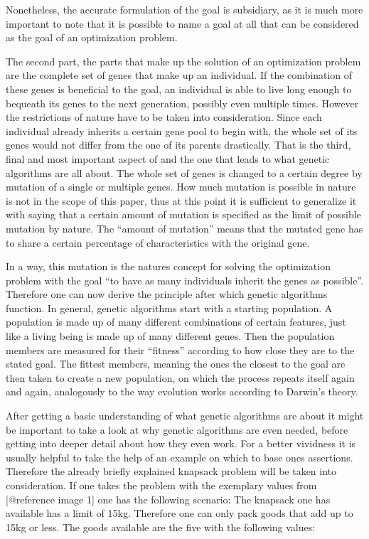 \documentclass[11pt,a4paper]{article}
\begin{document}
Nonetheless, the accurate formulation of the goal is subsidiary, as it is much more important to note that it is possible to name a goal at all that can be considered as the goal of an optimization problem.

The second part, the parts that make up the solution of an optimization problem are the complete set of genes that make up an individual. If the combination of these genes is beneficial to the goal, an individual is able to live long enough to bequeath its genes to the next generation, possibly even multiple times. However the restrictions of nature have to be taken into consideration. Since each individual already inherits a certain gene pool to begin with, the whole set of its genes would not differ from the one of its parents drastically. 
That is the third, final and most important aspect of and the one that leads to what genetic algorithms are all about. The whole set of genes is changed to a certain degree by mutation of a single or multiple genes. How much mutation is possible in nature is not in the scope of this paper, thus at this point it is sufficient to generalize it with saying that a certain amount of mutation is specified as the limit of possible mutation by nature. The “amount of mutation” means that the mutated gene has to share a certain percentage of characteristics with the original gene.

In a way, this mutation is the natures concept for solving the optimization problem with the goal “to have as many individuals inherit the genes as possible”. Therefore one can now derive the principle after which genetic algorithms function. In general, genetic algorithms start with a starting population. A population is made up of many different combinations of certain features, just like a living being is made up of many different genes. Then the population members are measured for their “fitness” according to how close they are to the stated goal. The fittest members, meaning the ones the closest to the goal are then taken to create a new population, on which the process repeats itself again and again, analogously to the way evolution works according to Darwin’s theory.

After getting a basic understanding of what genetic algorithms are about it might be important to take a look at why genetic algorithms are even needed, before getting into deeper detail about how they even work.
For a better vividness it is usually helpful to take the help of an example on which to base ones assertions. Therefore the already briefly explained knapsack problem will be taken into consideration.
If one takes the problem with the exemplary values from [@reference image 1] one has the following scenario:
The knapsack one has available has a limit of 15kg. Therefore one can only pack goods that add up to 15kg or less.
The goods available are the five with the following values:
\end{document}

